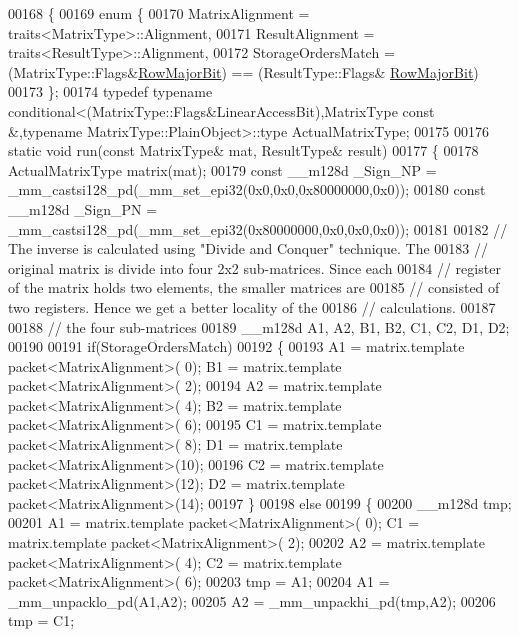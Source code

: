 \begin{DoxyCode}
00168 \{
00169   \textcolor{keyword}{enum} \{
00170     MatrixAlignment     = traits<MatrixType>::Alignment,
00171     ResultAlignment     = traits<ResultType>::Alignment,
00172     StorageOrdersMatch  = (MatrixType::Flags&\hyperlink{group__flags_gae4f56c2a60bbe4bd2e44c5b19cbe8762}{RowMajorBit}) == (ResultType::Flags&
      \hyperlink{group__flags_gae4f56c2a60bbe4bd2e44c5b19cbe8762}{RowMajorBit})
00173   \};
00174   \textcolor{keyword}{typedef} \textcolor{keyword}{typename} conditional<(MatrixType::Flags&LinearAccessBit),MatrixType const &,typename
       MatrixType::PlainObject>::type ActualMatrixType;
00175   
00176   \textcolor{keyword}{static} \textcolor{keywordtype}{void} run(\textcolor{keyword}{const} MatrixType& mat, ResultType& result)
00177   \{
00178     ActualMatrixType matrix(mat);
00179     \textcolor{keyword}{const} \_\_m128d \_Sign\_NP = \_mm\_castsi128\_pd(\_mm\_set\_epi32(0x0,0x0,0x80000000,0x0));
00180     \textcolor{keyword}{const} \_\_m128d \_Sign\_PN = \_mm\_castsi128\_pd(\_mm\_set\_epi32(0x80000000,0x0,0x0,0x0));
00181 
00182     \textcolor{comment}{// The inverse is calculated using "Divide and Conquer" technique. The}
00183     \textcolor{comment}{// original matrix is divide into four 2x2 sub-matrices. Since each}
00184     \textcolor{comment}{// register of the matrix holds two elements, the smaller matrices are}
00185     \textcolor{comment}{// consisted of two registers. Hence we get a better locality of the}
00186     \textcolor{comment}{// calculations.}
00187 
00188     \textcolor{comment}{// the four sub-matrices}
00189     \_\_m128d A1, A2, B1, B2, C1, C2, D1, D2;
00190     
00191     \textcolor{keywordflow}{if}(StorageOrdersMatch)
00192     \{
00193       A1 = matrix.template packet<MatrixAlignment>( 0); B1 = matrix.template packet<MatrixAlignment>( 2);
00194       A2 = matrix.template packet<MatrixAlignment>( 4); B2 = matrix.template packet<MatrixAlignment>( 6);
00195       C1 = matrix.template packet<MatrixAlignment>( 8); D1 = matrix.template packet<MatrixAlignment>(10);
00196       C2 = matrix.template packet<MatrixAlignment>(12); D2 = matrix.template packet<MatrixAlignment>(14);
00197     \}
00198     \textcolor{keywordflow}{else}
00199     \{
00200       \_\_m128d tmp;
00201       A1 = matrix.template packet<MatrixAlignment>( 0); C1 = matrix.template packet<MatrixAlignment>( 2);
00202       A2 = matrix.template packet<MatrixAlignment>( 4); C2 = matrix.template packet<MatrixAlignment>( 6);
00203       tmp = A1;
00204       A1 = \_mm\_unpacklo\_pd(A1,A2);
00205       A2 = \_mm\_unpackhi\_pd(tmp,A2);
00206       tmp = C1;

\end{DoxyCode}
